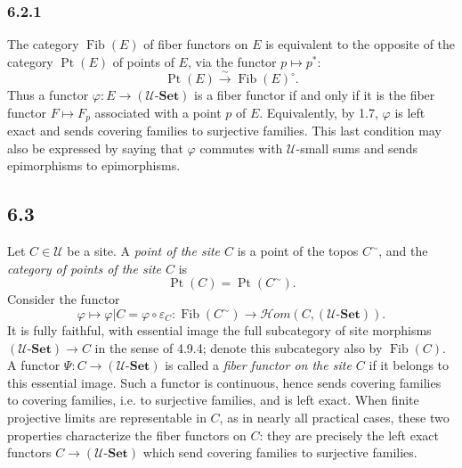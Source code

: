 \documentclass[11pt]{article}
\newcommand{\U}{\mathcal{U}}
\newcommand{\Set}{\mathbf{Set}}
\newcommand{\Ppoint}{\operatorname{Pt}}
\newcommand{\Ffib}{\operatorname{Fib}}
\newcommand{\Hhom}{\mathcal{H}om}
\begin{document}
\subsubsection*{6.2.1}
The category \(\Ffib(E)\) of fiber functors on \(E\) is equivalent to the opposite of the category \(\Ppoint(E)\) of points of \(E\), via the functor \(p\mapsto p^*\):
\begin{equation*}
\Ppoint(E)\xrightarrow{\sim}\Ffib(E)^{\circ}.\tag{6.2.1.1}
\end{equation*}
Thus a functor \(\varphi:E\to(\U\text{-}\Set)\) is a fiber functor if and only if it is the fiber functor \(F\mapsto F_p\) associated with a point \(p\) of \(E\). Equivalently, by 1.7, \(\varphi\) is left exact and sends covering families to surjective families. This last condition may also be expressed by saying that \(\varphi\) commutes with \(\U\)-small sums and sends epimorphisms to epimorphisms.

\subsection*{6.3}
Let \(C\in\U\) be a site. A \emph{point of the site \(C\)} is a point of the topos \(C^{\sim}\), and the \emph{category of points of the site \(C\)} is
\[
\Ppoint(C)=\Ppoint(C^{\sim}).
\]
Consider the functor
\begin{equation*}
\varphi\longmapsto \varphi|C=\varphi\circ\varepsilon_C:
\Ffib(C^{\sim})\longrightarrow \Hhom(C,(\U\text{-}\Set)).\tag{6.3.1}
\end{equation*}
It is fully faithful, with essential image the full subcategory of site morphisms \( (\U\text{-}\Set)\to C\) in the sense of 4.9.4; denote this subcategory also by \(\Ffib(C)\). A functor \(\Psi:C\to(\U\text{-}\Set)\) is called a \emph{fiber functor on the site \(C\)} if it belongs to this essential image. Such a functor is continuous, hence sends covering families to covering families, i.e. to surjective families, and is left exact. When finite projective limits are representable in \(C\), as in nearly all practical cases, these two properties characterize the fiber functors on \(C\): they are precisely the left exact functors \(C\to(\U\text{-}\Set)\) which send covering families to surjective families.
\end{document}
